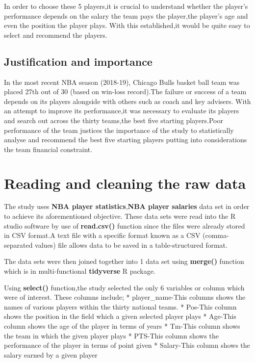 \documentclass[
]{article}
\begin{document}
In order to choose these 5 players,it is crucial to understand whether
the player's performance depends on the salary the team pays the
player,the player's age and even the position the player plays. With
this established,it would be quite easy to select and recommend the
players.

\hypertarget{justification-and-importance}{%
\subsection{Justification and
importance}\label{justification-and-importance}}

In the most recent NBA season (2018-19), Chicago Bulls basket ball team
was placed 27th out of 30 (based on win-loss record).The failure or
success of a team depends on its players alongside with others such as
coach and key advisers. With an attempt to improve its performance,it
was necessary to evaluate its players and search out across the thirty
teams,the best five starting players.Poor performance of the team
justices the importance of the study to statistically analyse and
recommend the best five starting players putting into considerations the
team financial constraint.

\hypertarget{reading-and-cleaning-the-raw-data}{%
\section{Reading and cleaning the raw
data}\label{reading-and-cleaning-the-raw-data}}

The study uses \textbf{NBA player statistics},\textbf{NBA player
salaries} data set in order to achieve its aforementioned objective.
These data sets were read into the R studio software by use of
\textbf{read.csv()} function since the files were already stored in CSV
format.A text file with a specific format known as a CSV
(comma-separated values) file allows data to be saved in a
table-structured format.

The data sets were then joined together into 1 data set using
\textbf{merge()} function which is in multi-functional
\textbf{tidyverse} R package.

Using \textbf{select()} function,the study selected the only 6 variables
or column which were of interest. These columns include; *
player\_name-This columns shows the names of various players within the
thirty national teams. * Pos-This column shows the position in the field
which a given selected player plays * Age-This column shows the age of
the player in terms of years * Tm-This column shows the team in which
the given player plays * PTS-This column shows the performance of the
player in terms of point given * Salary-This column shows the salary
earned by a given player
\end{document}
